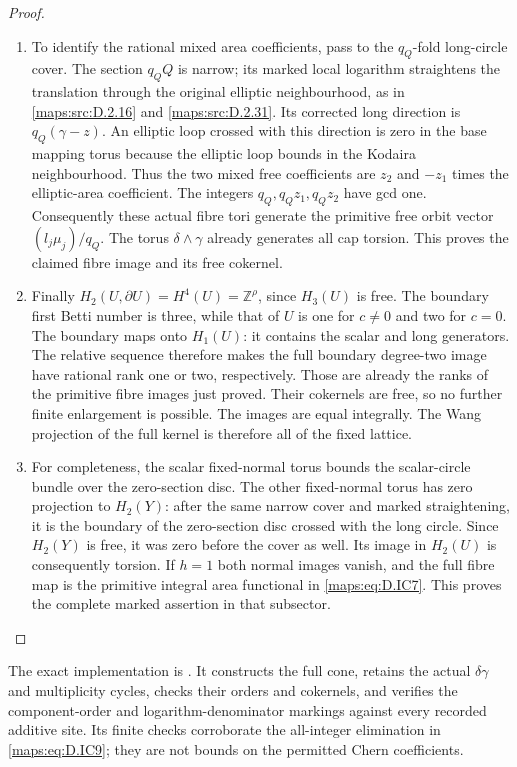 \begin{proof}
\begin{enumerate}[label=\arabic*.,leftmargin=*]
\item To identify the rational mixed area coefficients,
pass to the $q_Q$-fold long-circle cover.
The section $q_QQ$ is narrow; its marked local
logarithm straightens the translation through the
original elliptic neighbourhood, as in \ref{maps:src:D.2.16} and
\ref{maps:src:D.2.31}. Its corrected long direction is
$q_Q(\gamma-z)$. An elliptic loop crossed with this
direction is zero in the base mapping torus because
the elliptic loop bounds in the Kodaira neighbourhood.
Thus the two mixed free coefficients are $z_2$ and
$-z_1$ times the elliptic-area coefficient.
The integers $q_Q,q_Qz_1,q_Qz_2$ have gcd one.
Consequently these actual fibre tori generate the
primitive free orbit vector
$(l_j\mu_j)/q_Q$.
The torus $\delta\wedge\gamma$ already generates
all cap torsion. This proves the claimed fibre
image and its free cokernel.

\item Finally $H_2(U,\partial U)=H^4(U)=\mathbb Z^\rho$,
since $H_3(U)$ is free. The boundary first Betti
number is three, while that of $U$ is one for
$c\ne0$ and two for $c=0$. The boundary maps onto
$H_1(U)$: it contains the scalar and long generators.
The relative sequence therefore makes the full
boundary degree-two image have rational rank one
or two, respectively. Those are already the ranks
of the primitive fibre images just proved. Their
cokernels are free, so no further finite enlargement
is possible. The images are equal integrally.
The Wang projection of the full kernel is therefore
all of the fixed lattice.

\item For completeness, the scalar fixed-normal torus
bounds the scalar-circle bundle over the zero-section
disc. The other fixed-normal torus has zero projection
to $H_2(Y)$: after the same narrow cover and marked
straightening, it is the boundary of the zero-section
disc crossed with the long circle. Since $H_2(Y)$
is free, it was zero before the cover as well.
Its image in $H_2(U)$ is consequently torsion.
If $h=1$ both normal images vanish, and the full
fibre map is the primitive integral area functional
in \eqref{maps:eq:D.IC7}. This proves the complete marked assertion
in that subsector.
\end{enumerate}
\end{proof}

The exact implementation is
.
It constructs the full cone, retains the actual
$\delta\gamma$ and multiplicity cycles, checks their
orders and cokernels, and verifies the component-order
and logarithm-denominator markings against every
recorded additive site. Its finite checks corroborate
the all-integer elimination in \eqref{maps:eq:D.IC9}; they are not
bounds on the permitted Chern coefficients.


